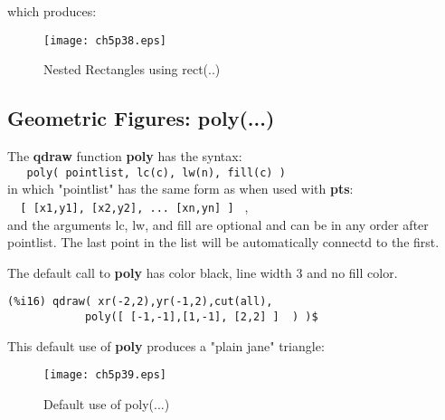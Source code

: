 \documentclass[12pt]{article}
\begin{document}
%
which produces:
\begin{figure} [h]
   \centerline{\texttt{[image: ch5p38.eps]} }
	\caption{Nested Rectangles using rect(..) }
\end{figure}      
 
\subsection{Geometric Figures: poly(...) }
The \textbf{qdraw} function \textbf{poly} has the syntax:\\
\verb|   poly( pointlist, lc(c), lw(n), fill(c) ) |\\
  in which "pointlist" has the same form as when used with \textbf{pts}:\\
  \verb|  [ [x1,y1], [x2,y2], ... [xn,yn] ] | ,\\
  and the arguments lc, lw, and fill are optional and can be
  in any order after pointlist.
The last point in the list will be automatically connectd to the first.
  
\smallskip
The default call to \textbf{poly} has color black, line width 3
  and no fill color.
\small
\begin{verbatim}
(%i16) qdraw( xr(-2,2),yr(-1,2),cut(all),
            poly([ [-1,-1],[1,-1], [2,2] ]  ) )$
\end{verbatim}
\normalsize
%
\newpage

This default use of \textbf{poly} produces a "plain jane" triangle:
\begin{figure} [h]
   \centerline{\texttt{[image: ch5p39.eps]} }
	\caption{Default use of poly(...) }
\end{figure}      
\end{document}
